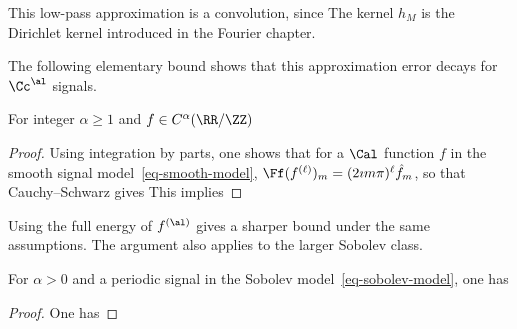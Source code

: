



This low-pass approximation is a convolution, since
The kernel $h_M$ is the Dirichlet kernel introduced in the Fourier chapter.

The following elementary bound shows that this approximation error decays for $\Cc^\al$ signals.

\begin{prop}
	For integer $\alpha\geq1$ and $f\in C^\alpha(\RR/\ZZ)$
\end{prop}

\begin{proof}
Using integration by parts, one shows that for a $\Cal$ function $f$ in the smooth signal model~\eqref{eq-smooth-model},
$\Ff(f^{(\ell)})_m = (2\imath m \pi)^\ell \hat f_m$, so that 
Cauchy--Schwarz gives
This implies
\end{proof}

Using the full energy of $f^{(\al)}$ gives a sharper bound under the same assumptions. The argument also applies to the larger Sobolev class.

\begin{prop}\label{prop-sobol-fourier-lin}
	For $\alpha>0$ and a periodic signal in the Sobolev model~\eqref{eq-sobolev-model}, one has
\end{prop}
\begin{proof}
	One has
\end{proof}

